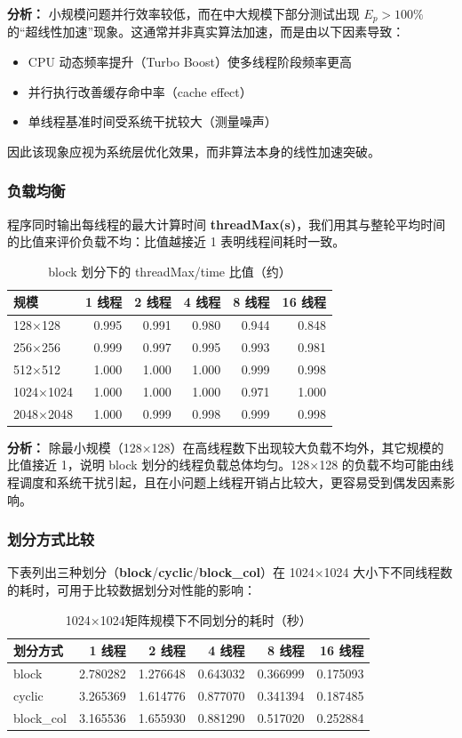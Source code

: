 \documentclass{SYSUReport}
\begin{document}
\textbf{分析：} 小规模问题并行效率较低，而在中大规模下部分测试出现 $E_p > 100\%$ 的“超线性加速”现象。这通常并非真实算法加速，而是由以下因素导致：
\begin{itemize}
    \item CPU 动态频率提升（Turbo Boost）使多线程阶段频率更高
    \item 并行执行改善缓存命中率（cache effect）
    \item 单线程基准时间受系统干扰较大（测量噪声）
\end{itemize}
因此该现象应视为系统层优化效果，而非算法本身的线性加速突破。

\subsubsection{负载均衡}
程序同时输出每线程的最大计算时间 \textbf{threadMax(s)}，我们用其与整轮平均时间的比值来评价负载不均：比值越接近 1 表明线程间耗时一致。
\begin{table}[H]
\centering
\caption{block 划分下的 threadMax/time 比值（约）}
\begin{tabular}{lrrrrr}
\toprule
规模 & 1 线程 & 2 线程 & 4 线程 & 8 线程 & 16 线程 \\
\midrule
128×128  & 0.995 & 0.991 & 0.980 & 0.944 & 0.848 \\
256×256  & 0.999 & 0.997 & 0.995 & 0.993 & 0.981 \\
512×512  & 1.000 & 1.000 & 1.000 & 0.999 & 0.998 \\
1024×1024 & 1.000 & 1.000 & 1.000 & 0.971 & 1.000 \\
2048×2048 & 1.000 & 0.999 & 0.998 & 0.999 & 0.998 \\
\bottomrule
\end{tabular}
\end{table}

\textbf{分析：} 除最小规模（128×128）在高线程数下出现较大负载不均外，其它规模的比值接近 1，说明 block 划分的线程负载总体均匀。128×128 的负载不均可能由线程调度和系统干扰引起，且在小问题上线程开销占比较大，更容易受到偶发因素影响。

\subsubsection{划分方式比较}
下表列出三种划分（\textbf{block}/\textbf{cyclic}/\textbf{block\_col}）在 1024×1024 大小下不同线程数的耗时，可用于比较数据划分对性能的影响：
\begin{table}[H]
\centering
\caption{1024×1024矩阵规模下不同划分的耗时（秒）}
    \begin{tabular}{lrrrrr}
\toprule
划分方式 & 1 线程 & 2 线程 & 4 线程 & 8 线程 & 16 线程 \\
\midrule
block & 2.780282 & 1.276648 & 0.643032 & 0.366999 & 0.175093 \\
cyclic & 3.265369 & 1.614776 & 0.877070 & 0.341394 & 0.187485 \\
block\_col & 3.165536 & 1.655930 & 0.881290 & 0.517020 & 0.252884 \\
\bottomrule
\end{tabular}
\end{table}
\end{document}
